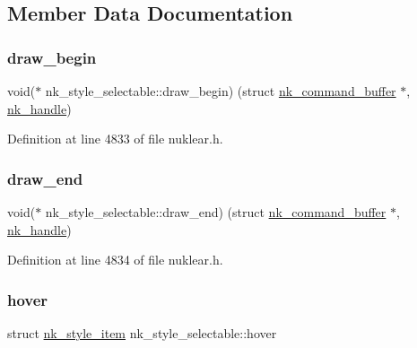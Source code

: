 \subsection{Member Data Documentation}
\mbox{\label{structnk__style__selectable_a5f8962de9e8498f98ca3a1d7b2d5e07c}} 
\subsubsection{\texorpdfstring{draw\+\_\+begin}{draw\_begin}}
{\footnotesize\ttfamily void($\ast$ nk\+\_\+style\+\_\+selectable\+::draw\+\_\+begin) (struct \mbox{\hyperlink{structnk__command__buffer}{nk\+\_\+command\+\_\+buffer}} $\ast$, \mbox{\hyperlink{unionnk__handle}{nk\+\_\+handle}})}



Definition at line 4833 of file nuklear.\+h.

\mbox{\label{structnk__style__selectable_aeee4d32977d1afe0c1980d5fae22fa31}} 
\subsubsection{\texorpdfstring{draw\+\_\+end}{draw\_end}}
{\footnotesize\ttfamily void($\ast$ nk\+\_\+style\+\_\+selectable\+::draw\+\_\+end) (struct \mbox{\hyperlink{structnk__command__buffer}{nk\+\_\+command\+\_\+buffer}} $\ast$, \mbox{\hyperlink{unionnk__handle}{nk\+\_\+handle}})}



Definition at line 4834 of file nuklear.\+h.

\mbox{\label{structnk__style__selectable_a4baf84a6176b653b765de870a9295f12}} 
\subsubsection{\texorpdfstring{hover}{hover}}
{\footnotesize\ttfamily struct \mbox{\hyperlink{structnk__style__item}{nk\+\_\+style\+\_\+item}} nk\+\_\+style\+\_\+selectable\+::hover}



